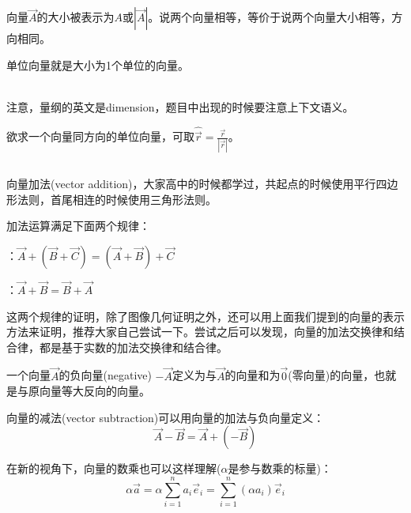 \subsection[向量的大小与单位向量]{}
向量$\vec{A}$的大小被表示为$A$或$\left | \vec{A} \right | $。说两个向量相等，等价于说两个向量大小相等，方向相同。

单位向量就是大小为1个单位的向量。
\begin{Itemize}
    \item {} 
    \\
    注意，量纲的英文是dimension，题目中出现的时候要注意上下文语义。
\end{Itemize}

欲求一个向量同方向的单位向量，可取$\displaystyle\hat{\vec{r}} =\frac{\vec{r} }{\left | \vec{r} \right | } $。
\subsection[向量的运算]{}
向量加法(vector addition)，大家高中的时候都学过，共起点的时候使用平行四边形法则，首尾相连的时候使用三角形法则。

加法运算满足下面两个规律：
\begin{Itemize}
    \item {}：$\vec{A}+(\vec{B}+\vec{C})=(\vec{A}+\vec{B})+\vec{C}$
    \item {}：$\vec{A}+\vec{B}=\vec{B}+\vec{A}$
\end{Itemize}
这两个规律的证明，除了图像几何证明之外，还可以用上面我们提到的向量的表示方法来证明，推荐大家自己尝试一下。尝试之后可以发现，向量的加法交换律和结合律，都是基于实数的加法交换律和结合律。

一个向量$\vec{A}$的负向量(negative) $-\vec{A}$定义为与$\vec{A}$的向量和为$\vec{0}$(零向量)的向量，也就是与原向量等大反向的向量。

向量的减法(vector subtraction)可以用向量的加法与负向量定义：
\[\vec{A}-\vec{B}=\vec{A}+(-\vec{B})\]

在新的视角下，向量的数乘也可以这样理解($\alpha$是参与数乘的标量)：
\[\alpha \vec{a}=\alpha \sum_{i=1}^{n}  a_{i} \vec{e }_{i} =\sum_{i=1}^{n} (\alpha a_{i} )\vec{e }_{i}\]

